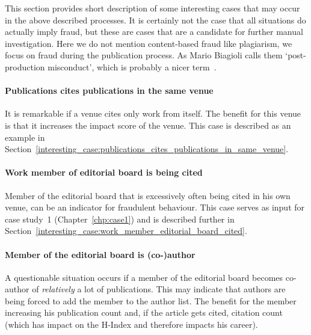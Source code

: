 \documentclass{ou-report}
\newcommand{\outline}[1]{{\color{blue} #1}}
\begin{document}
This section provides short description of some interesting cases that may 
occur in the above described processes.
It is certainly not the case that all situations do actually imply fraud, but 
these are cases that are a candidate for further manual investigation.
Here we do not mention content-based fraud like plagiarism, we focus on fraud
during the publication process. As Mario Biagioli calls them `post-production 
misconduct', which is probably a nicer term~\cite{biagioli2020gaming}.

\paragraph{Publications cites publications in the same venue} It is remarkable
if a venue cites only work from itself. The benefit for this venue is that it
increases the impact score of the venue. This case is described as an example in 
Section~\ref{interesting_case:publications_cites_publications_in_same_venue}.
\paragraph{Work member of editorial board is being cited} Member of the
editorial board that is excessively often being cited in his own venue, can be
an indicator for fraudulent behaviour. This case serves as input for case 
study~1 (Chapter~\ref{chp:case1}) and is described further in 
Section~\ref{interesting_case:work_member_editorial_board_cited}.
\paragraph{Member of the editorial board is (co-)author} 
A questionable situation occurs if a member of the editorial board becomes 
co-author 
of \textit{relatively} a lot of publications. This may indicate that 
authors are being forced to add the member to the author list. The benefit for
the member increasing his publication count and, if the article gets cited, 
citation count (which has impact on the H-Index and therefore impacts his 
career).
\end{document}
